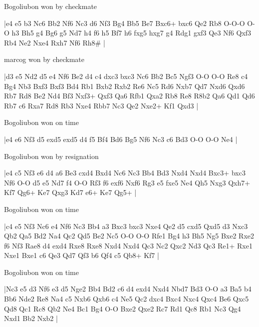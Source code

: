 \showboard

Bogoliubon won by checkmate

\makegametitle
|e4 e5 b3 Nc6 Bb2 Nf6 Nc3 d6 Nf3 Bg4 Bb5 Be7 Bxc6+ bxc6 Qe2 Rb8 O-O-O O-O h3 Bh5 g4 Bg6 g5 Nd7 h4 f6 h5 Bf7 h6 fxg5 hxg7 g4 Rdg1 gxf3 Qe3 Nf6 Qxf3 Rb4 Ne2 Nxe4 Rxh7 Nf6 Rh8\#  |

\showboard

marcog won by checkmate

\makegametitle
|d3 e5 Nd2 d5 e4 Nf6 Be2 d4 c4 dxc3 bxc3 Nc6 Bb2 Bc5 Ngf3 O-O O-O Re8 c4 Bg4 Nb3 Bxf3 Bxf3 Bd4 Rb1 Bxb2 Rxb2 Re6 Nc5 Rd6 Nxb7 Qd7 Nxd6 Qxd6 Rb7 Rd8 Be2 Nd4 Bf3 Nxf3+ Qxf3 Qa6 Rfb1 Qxa2 Rb8 Re8 R8b2 Qa6 Qd1 Qd6 Rb7 c6 Rxa7 Rd8 Rb3 Nxe4 Rbb7 Nc3 Qe2 Nxe2+ Kf1 Qxd3  |

\showboard

Bogoliubon won on time

\makegametitle
|e4 e6 Nf3 d5 exd5 exd5 d4 f5 Bf4 Bd6 Bg5 Nf6 Nc3 c6 Bd3 O-O O-O Ne4  |

\showboard

Bogoliubon won by resignation

\makegametitle
|e4 c5 Nf3 e6 d4 a6 Be3 cxd4 Bxd4 Nc6 Nc3 Bb4 Bd3 Nxd4 Nxd4 Bxc3+ bxc3 Nf6 O-O d5 e5 Nd7 f4 O-O Rf3 f6 exf6 Nxf6 Rg3 e5 fxe5 Ne4 Qh5 Nxg3 Qxh7+ Kf7 Qg6+ Ke7 Qxg3 Kd7 e6+ Ke7 Qg5+  |

\showboard

Bogoliubon won on time

\makegametitle
|c4 e5 Nf3 Nc6 e4 Nf6 Nc3 Bb4 a3 Bxc3 bxc3 Nxe4 Qe2 d5 cxd5 Qxd5 d3 Nxc3 Qb2 Qa5 Bd2 Na4 Qc2 Qd5 Be2 Nc5 O-O O-O Rfe1 Bg4 h3 Bh5 Ng5 Bxe2 Rxe2 f6 Nf3 Rae8 d4 exd4 Rxe8 Rxe8 Nxd4 Nxd4 Qc3 Nc2 Qxc2 Nd3 Qc3 Re1+ Rxe1 Nxe1 Bxe1 c6 Qe3 Qd7 Qf3 b6 Qf4 c5 Qb8+ Kf7  |

\showboard

Bogoliubon won on time

\makegametitle
|Nc3 e5 d3 Nf6 e3 d5 Nge2 Bb4 Bd2 c6 d4 exd4 Nxd4 Nbd7 Bd3 O-O a3 Ba5 b4 Bb6 Nde2 Re8 Na4 c5 Nxb6 Qxb6 c4 Ne5 Qc2 dxc4 Bxc4 Nxc4 Qxc4 Be6 Qxc5 Qd8 Qc1 Rc8 Qb2 Ne4 Bc1 Bg4 O-O Bxe2 Qxe2 Rc7 Rd1 Qc8 Rb1 Nc3 Qg4 Nxd1 Bb2 Nxb2  |

